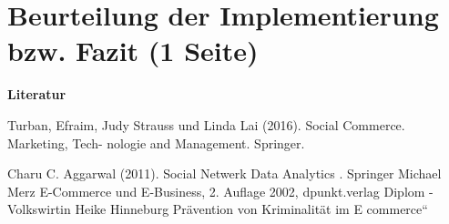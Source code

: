 
\chapter{Beurteilung der Implementierung bzw. Fazit (1 Seite)}

\textbf{Literatur}

Turban, Efraim, Judy Strauss und Linda Lai (2016). Social Commerce. Marketing, Tech-
nologie and Management. Springer.

Charu C. Aggarwal (2011). Social Netwerk Data Analytics . Springer
Michael Merz E-Commerce und E-Business, 2. Auflage 2002, dpunkt.verlag 
Diplom -Volkswirtin Heike Hinneburg Prävention von Kriminalität im E commerce“ 